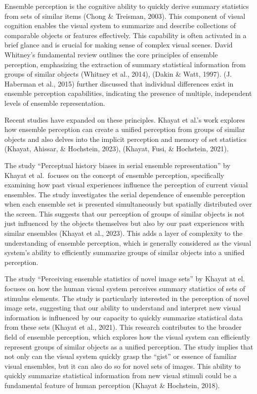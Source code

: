 \documentclass[print]{nuthesis}
\begin{document}
Ensemble perception is the cognitive ability to quickly derive summary statistics from sets of similar items (Chong \& Treisman, 2003).
This component of visual cognition enables the visual system to summarize and describe collections of comparable objects or features effectively.
This capability is often activated in a brief glance and is crucial for making sense of complex visual scenes.
David Whitney's fundamental review outlines the core principles of ensemble perception, emphasizing the extraction of summary statistical information from groups of similar objects (Whitney et al., 2014), (Dakin \& Watt, 1997).
(J. Haberman et al., 2015) further discussed that individual differences exist in ensemble perception capabilities, indicating the presence of multiple, independent levels of ensemble representation.

Recent studies have expanded on these principles.
Khayat et al.'s work explores how ensemble perception can create a unified perception from groups of similar objects and also delves into the implicit perception and memory of set statistics (Khayat, Ahissar, \& Hochstein, 2023), (Khayat, Fusi, \& Hochstein, 2021).

The study ``Perceptual history biases in serial ensemble representation'' by Khayat et al.~focuses on the concept of ensemble perception, specifically examining how past visual experiences influence the perception of current visual ensembles.
The study investigates the serial dependence of ensemble perception when each ensemble set is presented simultaneously but spatially distributed over the screen.
This suggests that our perception of groups of similar objects is not just influenced by the objects themselves but also by our past experiences with similar ensembles (Khayat et al., 2023).
This adds a layer of complexity to the understanding of ensemble perception, which is generally considered as the visual system's ability to efficiently summarize groups of similar objects into a unified perception.

The study ``Perceiving ensemble statistics of novel image sets'' by Khayat at el. focuses on how the human visual system perceives summary statistics of sets of stimulus elements.
The study is particularly interested in the perception of novel image sets, suggesting that our ability to understand and interpret new visual information is influenced by our capacity to quickly summarize statistical data from these sets (Khayat et al., 2021).
This research contributes to the broader field of ensemble perception, which explores how the visual system can efficiently represent groups of similar objects as a unified perception.
The study implies that not only can the visual system quickly grasp the ``gist'' or essence of familiar visual ensembles, but it can also do so for novel sets of images.
This ability to quickly summarize statistical information from new visual stimuli could be a fundamental feature of human perception (Khayat \& Hochstein, 2018).
\end{document}

